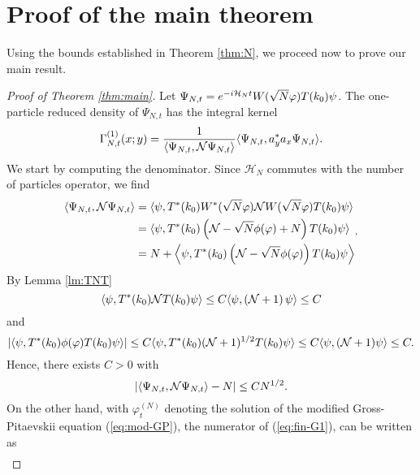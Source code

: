 \documentclass[11pt,a4paper]{article}
\newcommand{\cH}{{\cal H}}
\newcommand{\cN}{{\cal N}}
\newcommand{\Hcal}{\mathcal{H}}		%
\begin{document}
\section{Proof of the main theorem}

Using the bounds established in Theorem \ref{thm:N}, we proceed now to prove our main result.

\begin{proof}[Proof of Theorem \ref{thm:main}]
Let $\Psi_{N,t} = e^{-i\cH_N t} W(\sqrt{N} \varphi) T(k_0) \psi$. The one-particle reduced density of $\Psi_{N,t}$ has the integral kernel
\begin{equation}\label{eq:fin-G1} \Gamma_{N,t}^{(1)} (x;y) = \frac{1}{\langle \Psi_{N,t} , \cN \Psi_{N,t} \rangle} \langle \Psi_{N,t} , a_y^* a_x \Psi_{N,t} \rangle. \end{equation}
We start by computing the denominator. Since $\Hcal_N$ commutes with the number of particles operator, we find
\[ \begin{split} 
\langle \Psi_{N,t} , \cN \Psi_{N,t} \rangle = \; &\langle \psi,T^* (k_0) W^* (\sqrt{N} \varphi) \cN W (\sqrt{N} \varphi)  T(k_0) \psi\rangle  \\ = \; &\langle \psi, T^* (k_0) \left( \cN - \sqrt{N} \phi (\varphi) + N \right) T(k_0) \psi \rangle \\ = \; &N + \left\langle \psi,  T^* (k_0) \left(\cN - \sqrt{N} \phi(\varphi) \right) T(k_0) \psi \right\rangle\end{split}. \]
By Lemma \ref{lm:TNT}
\[  \langle \psi , T^* (k_0) \cN T(k_0) \psi \rangle \leq C \langle \psi , (\cN+1) \, \psi \rangle \leq C \]
and 
\[ \left| \langle \psi , T^*(k_0) \phi (\varphi) T(k_0) \psi \rangle \right| \leq C \langle \psi, T^* (k_0) (\cN+1)^{1/2} T(k_0) \psi \rangle \leq C \langle \psi , (\cN+1) \psi \rangle \leq C. \]
Hence, there exists $C>0$ with
\begin{equation}\label{eq:fin-G2} \left| \langle \Psi_{N,t} , \cN \Psi_{N,t} \rangle - N \right| \leq C N^{1/2}. \end{equation}
On the other hand, with $\varphi^{(N)}_t$ denoting the solution of the modified Gross-Pitaevskii equation (\ref{eq:mod-GP}), the numerator of (\ref{eq:fin-G1}), can be written as  
\[ \begin{split} 

\end{split}\]
\end{proof}
\end{document}
